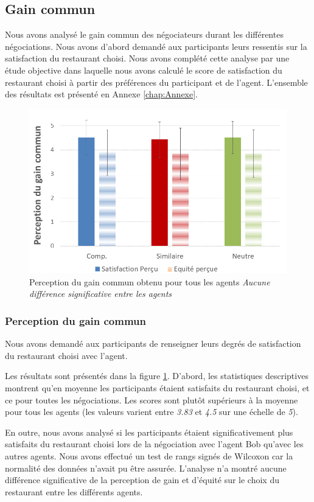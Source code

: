 	\subsection{Gain commun}
	Nous avons analysé le gain commun des négociateurs durant les différentes négociations. Nous avons d'abord demandé aux participants leurs ressentis sur la satisfaction du restaurant choisi. Nous avons complété cette analyse par une étude objective dans laquelle nous avons calculé le score de satisfaction du restaurant choisi à partir des préférences du participant et de l'agent. L'ensemble des résultats est présenté en Annexe \ref{chap:Annexe}.
	
		\begin{figure}[h]
		
		\centering
		\includegraphics[width= 0.65 \linewidth,clip=false]{Figures/chap7/percpGain.PNG}
		\caption{Perception du gain commun obtenu pour tous les agents \textit{Aucune différence significative entre les agents}}
		\label{fig:gainCom}
	\end{figure}

	\subsubsection{Perception du gain commun} Nous avons demandé aux participants de renseigner leurs degrés de satisfaction du restaurant choisi avec l'agent.
	
	Les résultats sont présentés dans la figure \ref{fig:gainCom}. D'abord, les statistiques descriptives montrent qu'en moyenne les participants étaient satisfaits du restaurant choisi, et ce pour toutes les négociations. Les scores sont plutôt supérieurs à la moyenne pour tous les agents (les valeurs varient entre \emph{3.83} et \emph{4.5} sur une échelle de \emph{5}). 
	
	En outre, nous avons analysé si les participants étaient significativement plus satisfaits du restaurant choisi lors de la négociation avec l'agent Bob qu'avec les autres agents. Nous avons effectué un test de rangs signés de Wilcoxon car la normalité des données n'avait pu être assurée. L'analyse n'a montré aucune différence significative de la perception de gain et d'équité sur le choix du restaurant entre les différents agents. 
	
